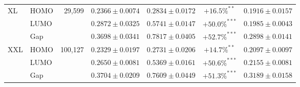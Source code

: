 \begin{table}[t]
\begin{tabular}{llrcccc}
\midrule
XL & HOMO & 29,599 & $0.2366 \pm 0.0074$ & $0.2834 \pm 0.0172$ & $+16.5\%^{**}$ & $0.1916 \pm 0.0157$ \\
 & LUMO &  & $0.2872 \pm 0.0325$ & $0.5741 \pm 0.0147$ & $+50.0\%^{***}$ & $0.1985 \pm 0.0043$ \\
 & Gap &  & $0.3698 \pm 0.0341$ & $0.7817 \pm 0.0405$ & $+52.7\%^{***}$ & $0.2898 \pm 0.0141$ \\
\midrule
XXL & HOMO & 100,127 & $0.2329 \pm 0.0197$ & $0.2731 \pm 0.0206$ & $+14.7\%^{**}$ & $0.2097 \pm 0.0097$ \\
 & LUMO &  & $0.2650 \pm 0.0081$ & $0.5369 \pm 0.0161$ & $+50.6\%^{***}$ & $0.2155 \pm 0.0081$ \\
 & Gap &  & $0.3704 \pm 0.0209$ & $0.7609 \pm 0.0449$ & $+51.3\%^{***}$ & $0.3189 \pm 0.0158$ \\
\bottomrule
\end{tabular}
\end{table}